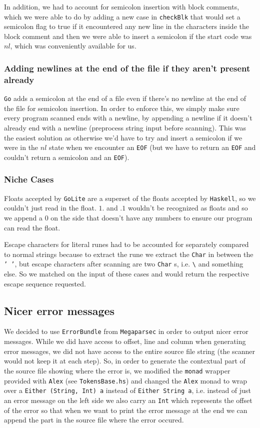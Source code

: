 \documentclass[11pt]{article}
\begin{document}
In addition, we had to account for semicolon insertion with block
comments, which we were able to do by adding a new case in
\texttt{checkBlk} that would set a semicolon flag to true if it
encountered any new line in the characters inside the block comment
and then we were able to insert a semicolon if the start code was
\(nl\), which was conveniently available for us.
\subsubsection{Adding newlines at the end of the file if they aren't present already}
\label{sec:orgd656717}
\texttt{Go} adds a semicolon at the end of a file even if there's no
newline at the end of the file for semicolon insertion. In order
to enforce this, we simply make sure every program scanned ends
with a newline, by appending a newline if it doesn't already end
with a newline (preprocess string input before scanning). This was
the easiest solution as otherwise we'd have to try and insert a
semicolon if we were in the \(nl\) state when we encounter an \texttt{EOF}
(but we have to return an \texttt{EOF} and couldn't return a semicolon
and an \texttt{EOF}).
\subsubsection{Niche Cases}
\label{sec:org4368754}
Floats accepted by \texttt{GoLite} are a superset of the floats accepted
by \texttt{Haskell}, so we couldn't just read in the float. \(1.\) and
\(.1\) wouldn't be recognized as floats and so we append a \(0\) on
the side that doesn't have any numbers to ensure our program can
read the float.

Escape characters for literal runes had to be accounted for
separately compared to normal strings because to extract the rune
we extract the \texttt{Char} in between the \texttt{' '}, but escape characters
after scanning are two \texttt{Char} s, i.e. \texttt{\textbackslash{}} and something else. So
we matched on the input of these cases and would return the
respective escape sequence requested.
\subsection{Nicer error messages}
\label{sec:org386b970}
We decided to use \texttt{ErrorBundle} from \texttt{Megaparsec} in order to
output nicer error messages. While we did have access to offset,
line and column when generating error messages, we did not have
access to the entire source file string (the scanner would not keep
it at each step). So, in order to generate the contextual part of
the source file showing where the error is, we modified the \texttt{monad}
wrapper provided with \texttt{Alex} (see \texttt{TokensBase.hs}) and changed the
\texttt{Alex} monad to wrap over a \texttt{Either (String, Int) a} instead of
\texttt{Either String a}, i.e. instead of just an error message on the
left side we also carry an \texttt{Int} which represents the offset of the
error so that when we want to print the error message at the end we
can append
the part in the source file where the error occured.
\end{document}
